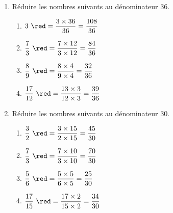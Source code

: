 \begin{corrige}
    \phantom{rrr}  

    \begin{enumerate}
        \hspace*{-5mm}\item Réduire les nombres suivants au dénominateur \num{36}.
        \begin{multicols}{2}
            \begin{spacing}{1.5}
                \begin{enumerate}
                    \item $3                ~{\red =\dfrac{3\times36}{36}=\dfrac{108}{36}}$
                    \item $\dfrac{7}{3}     ~{\red =\dfrac{7\times12}{3\times12}=\dfrac{84}{36}}$
                    \item $\dfrac{8}{9}     ~{\red =\dfrac{8\times4}{9\times4}=\dfrac{32}{36}}$
                    \item $\dfrac{17}{12}   ~{\red =\dfrac{13\times3}{12\times3}=\dfrac{39}{36}}$
                \end{enumerate}
            \end{spacing}
        \end{multicols}
    \end{enumerate}
    \begin{enumerate}
        \setcounter{enumi}{1}
        \hspace{-5mm}\item Réduire les nombres suivants au dénominateur \num{30}.
        \begin{multicols}{2}
            \begin{spacing}{1.5}
                \begin{enumerate}
                    \item $\dfrac{3}{2}     ~{\red =\dfrac{3\times15}{2\times15}=\dfrac{45}{30}}$
                    \item $\dfrac{7}{3}     ~{\red =\dfrac{7\times10}{3\times10}=\dfrac{70}{30}}$
                    \item $\dfrac{5}{6}     ~{\red =\dfrac{5\times5}{6\times5}=\dfrac{25}{30}}$
                    \item $\dfrac{17}{15}   ~{\red =\dfrac{17\times2}{15\times2}=\dfrac{34}{30}}$
                \end{enumerate}
            \end{spacing}
        \end{multicols}
    \end{enumerate}

\end{corrige}

